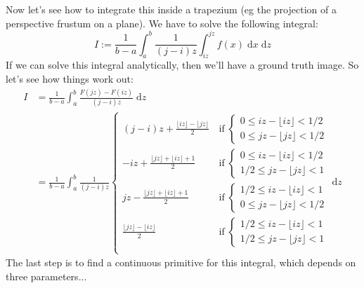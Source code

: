 \documentclass[11pt,a4paper,oneside]{report}
\begin{document}
Now let's see how to integrate this inside a trapezium (eg the projection of a 
perspective frustum on a plane).
We have to solve the following integral:
\begin{equation*}
	I := 
	\frac{1}{b-a}\int_{a}^{b} 
	\frac{1}{(j-i)z}
	\int_{iz}^{jz}
	f(x) \; \textrm{d}x \; \textrm{d}z
\end{equation*}
If we can solve this integral analytically, then we'll have a ground truth 
image. So let's see how things work out:
\begin{align*}
	I &= \frac{1}{b-a}\int_{a}^{b} 
	     \frac{F(jz) - F(iz)}{(j-i)z} \; \textrm{d}z \\
	  &= \frac{1}{b-a}\int_{a}^{b} \frac{1}{(j-i)z}
	\left\{
	\begin{array}{cccc}
	\displaystyle 
	(j-i)z + \frac{\lfloor iz  \rfloor-\lfloor jz \rfloor}{2} 
	\, & \text{if} \;
	\left\{
	\begin{array}{ll}
	0\leq iz - \lfloor iz \rfloor < 1/2 \\
	0\leq jz - \lfloor jz \rfloor < 1/2
	\end{array} \right. \\
	\displaystyle 
	-iz + \frac{\lfloor jz  \rfloor+\lfloor iz \rfloor+1}{2} 
	\, & \text{if} \;
	\left\{
	\begin{array}{cc}
	0 \leq iz - \lfloor iz \rfloor < 1/2 \\
	1/2 \leq jz - \lfloor jz \rfloor < 1
	\end{array} \right. \\
	\displaystyle 
	jz - \frac{\lfloor jz  \rfloor+\lfloor iz \rfloor+1}{2} 
	\, & \text{if} \;
	\left\{
	\begin{array}{cc}
	1/2 \leq iz - \lfloor iz \rfloor < 1 \\
	0 \leq jz - \lfloor jz \rfloor < 1/2
	\end{array} \right. \\
	\displaystyle 
	\frac{\lfloor jz \rfloor-\lfloor iz \rfloor}{2} 
	\, & \text{if} \;
	\left\{
	\begin{array}{ll}
	1/2\leq iz - \lfloor iz \rfloor < 1 \\
	1/2\leq jz - \lfloor jz \rfloor < 1
	\end{array} \right. \\
	\end{array} \right. \! \textrm{d}z
\end{align*}
The last step is to find a continuous primitive for this integral, which depends
on three parameters...
\end{document}
